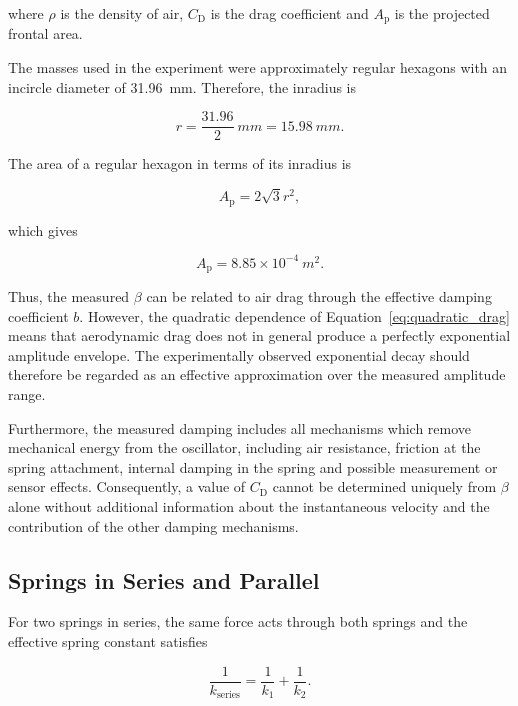 \documentclass[12pt,a4paper]{article}
\begin{document}
where $\rho$ is the density of air, $C_{\mathrm{D}}$ is the drag coefficient and $A_{\mathrm{p}}$ is the projected frontal area.

The masses used in the experiment were approximately regular hexagons with an incircle diameter of \SI{31.96}{mm}. Therefore, the inradius is

\begin{equation}
r=\frac{31.96}{2}\ \si{mm}
=\SI{15.98}{mm}.
\end{equation}

The area of a regular hexagon in terms of its inradius is

\begin{equation}
A_{\mathrm{p}}=2\sqrt{3}r^2,
\end{equation}

which gives

\begin{equation}
\boxed{
A_{\mathrm{p}}
=
8.85\times10^{-4}\ \si{m^2}
}.
\end{equation}

Thus, the measured $\beta$ can be related to air drag through the effective damping coefficient $b$. However, the quadratic dependence of Equation~\ref{eq:quadratic_drag} means that aerodynamic drag does not in general produce a perfectly exponential amplitude envelope. The experimentally observed exponential decay should therefore be regarded as an effective approximation over the measured amplitude range.

Furthermore, the measured damping includes all mechanisms which remove mechanical energy from the oscillator, including air resistance, friction at the spring attachment, internal damping in the spring and possible measurement or sensor effects. Consequently, a value of $C_{\mathrm{D}}$ cannot be determined uniquely from $\beta$ alone without additional information about the instantaneous velocity and the contribution of the other damping mechanisms.

\subsection{Springs in Series and Parallel}

For two springs in series, the same force acts through both springs and the effective spring constant satisfies

\begin{equation}
\frac{1}{k_{\mathrm{series}}}
=
\frac{1}{k_1}+\frac{1}{k_2}.
\label{eq:series}
\end{equation}
\end{document}
